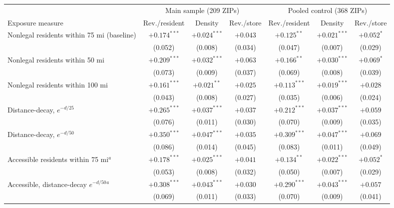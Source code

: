 \begin{tabular}{@{}lcccccc@{}}
\toprule
 & \multicolumn{3}{c}{Main sample (209 ZIPs)} & \multicolumn{3}{c}{Pooled control (368 ZIPs)} \\
\cmidrule(lr){2-4}\cmidrule(lr){5-7}
Exposure measure & Rev./resident & Density & Rev./store & Rev./resident & Density & Rev./store \\
\midrule
Nonlegal residents within 75 mi (baseline) & $+0.174^{***}$ & $+0.024^{***}$ & $+0.043$ & $+0.125^{**}$ & $+0.021^{***}$ & $+0.052^{*}$ \\
 & (0.052) & (0.008) & (0.034) & (0.047) & (0.007) & (0.029) \\
Nonlegal residents within 50 mi & $+0.209^{***}$ & $+0.032^{***}$ & $+0.063$ & $+0.166^{**}$ & $+0.030^{***}$ & $+0.069^{*}$ \\
 & (0.073) & (0.009) & (0.037) & (0.069) & (0.008) & (0.039) \\
Nonlegal residents within 100 mi & $+0.161^{***}$ & $+0.021^{**}$ & $+0.025$ & $+0.113^{***}$ & $+0.019^{***}$ & $+0.028$ \\
 & (0.043) & (0.008) & (0.027) & (0.035) & (0.006) & (0.024) \\
Distance-decay, $e^{-d/25}$ & $+0.265^{***}$ & $+0.037^{***}$ & $+0.037$ & $+0.212^{***}$ & $+0.037^{***}$ & $+0.059$ \\
 & (0.076) & (0.011) & (0.030) & (0.070) & (0.009) & (0.035) \\
Distance-decay, $e^{-d/50}$ & $+0.350^{***}$ & $+0.047^{***}$ & $+0.035$ & $+0.309^{***}$ & $+0.047^{***}$ & $+0.069$ \\
 & (0.086) & (0.014) & (0.045) & (0.083) & (0.011) & (0.049) \\
Accessible residents within 75 mi$^{a}$ & $+0.178^{***}$ & $+0.025^{***}$ & $+0.041$ & $+0.134^{**}$ & $+0.022^{***}$ & $+0.052^{*}$ \\
 & (0.053) & (0.008) & (0.032) & (0.050) & (0.007) & (0.029) \\
Accessible, distance-decay $e^{-d/50}$$^{a}$ & $+0.308^{***}$ & $+0.043^{***}$ & $+0.030$ & $+0.290^{***}$ & $+0.043^{***}$ & $+0.057$ \\
 & (0.069) & (0.011) & (0.033) & (0.070) & (0.009) & (0.041) \\
\bottomrule
\end{tabular}
